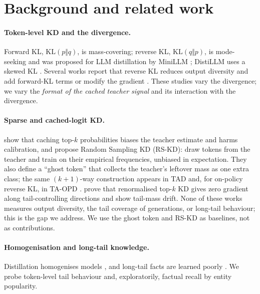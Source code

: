\documentclass[11pt]{article}
\newcommand{\KL}{\mathrm{KL}}
\begin{document}
\section{Background and related work}

\paragraph{Token-level KD and the divergence.} Forward KL, $\KL(p\Vert q)$, is mass-covering; reverse KL,
$\KL(q\Vert p)$, is mode-seeking and was proposed for LLM distillation by MiniLLM \citep{gu2024minillm}; DistiLLM
uses a skewed KL \citep{ko2024distillm}. Several works report that reverse KL reduces output diversity and add
forward-KL terms or modify the gradient \citep{jin2026eopd,luong2026drkl}. These studies vary the divergence; we
vary the \emph{format of the cached teacher signal} and its interaction with the divergence.

\paragraph{Sparse and cached-logit KD.} \citet{anshumann2025sparse} show that caching top-$k$ probabilities biases
the teacher estimate and harms calibration, and propose Random Sampling KD (RS-KD): draw tokens from the teacher and
train on their empirical frequencies, unbiased in expectation. They also define a ``ghost token'' that collects
the teacher's leftover mass as one extra class; the same $(k{+}1)$-way construction appears in TAD
\citep{dasgupta2026tad} and, for on-policy reverse KL, in TA-OPD \citep{huang2026taopd}. \citet{topkgradient2026}
prove that renormalised top-$k$ KD gives zero gradient along tail-controlling directions and show tail-mass drift.
None of these works measures output diversity, the tail coverage of generations, or long-tail behaviour; this is
the gap we address. We use the ghost token and RS-KD as baselines, not as contributions.

\paragraph{Homogenisation and long-tail knowledge.} Distillation homogenises models \citep{quantdistill2025}, and
long-tail facts are learned poorly \citep{kandpal2023longtail,mallen2023popqa}. We probe token-level tail behaviour
and, exploratorily, factual recall by entity popularity.
\end{document}
